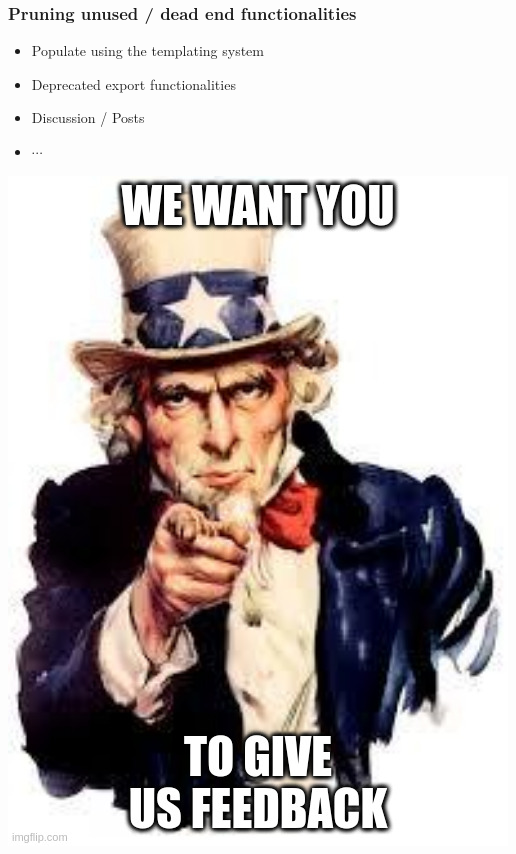 \begin{frame}
    \frametitle{Pruning unused / dead end functionalities}
    \begin{minipage}{0.7\textwidth}
        \begin{itemize}
            \item Populate using the templating system
            \item Deprecated export functionalities
            \item Discussion / Posts
            \item $\cdots$
        \end{itemize}
    \end{minipage}%
    \begin{minipage}{0.3\textwidth}
        \begin{center}
            \;\;\includegraphics[width=1\linewidth]{pictures/we-want-you.jpeg}
        \end{center}
    \end{minipage}
    
\end{frame}

